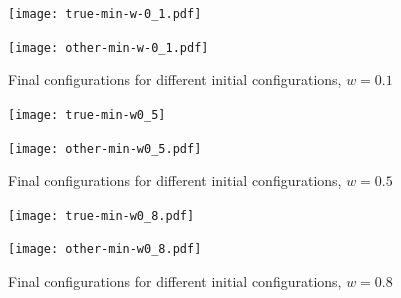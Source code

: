 \documentclass[12pt,oneside,final]{thesis}\usepackage[]{graphicx}\usepackage[]{color}
\begin{document}
\begin{figure}
\begin{minipage}[b]{0.46\linewidth}
\centering
\texttt{[image: true-min-w-0\_1.pdf]}

\label{fig:Finalconfig-MultMin-w-0_1_a}
\end{minipage}
\hspace{0.5cm}
\begin{minipage}[b]{0.46\linewidth}
\centering
\texttt{[image: other-min-w-0\_1.pdf]}

\label{fig:Finalconfig-MultMin-w-0_1_b}
\end{minipage}

\caption{Final configurations for different initial configurations, $w=0.1$ }
\label{fig:Finalconfig-MultMin-w-0_1}


\end{figure}




\begin{figure}
\begin{minipage}[b]{0.46\linewidth}
\centering
\texttt{[image: true-min-w0\_5]}

\label{fig:Finalconfig-MultMin-w-0_5_a}

\end{minipage}
\hspace{0.5cm}
\begin{minipage}[b]{0.46\linewidth}
\centering
\texttt{[image: other-min-w0\_5.pdf]}

\label{fig:Finalconfig-MultMin-w-0_5_b}

\end{minipage}

\caption{Final configurations for different initial configurations, $w=0.5$ }
\label{fig:Finalconfig-MultMin-w-0_5}

\end{figure}

\begin{figure}
\begin{minipage}[b]{0.46\linewidth}
\centering
\texttt{[image: true-min-w0\_8.pdf]}
\label{fig:Finalconfig-MultMin-w-0_8_a}


\end{minipage}
\hspace{0.5cm}
\begin{minipage}[b]{0.46\linewidth}
\centering
\texttt{[image: other-min-w0\_8.pdf]}
\label{fig:Finalconfig-MultMin-w-0_8_b}


\end{minipage}

\caption{Final configurations for different initial configurations, $w=0.8$ }
\label{fig:Finalconfig-MultMin-w-0_8}

\end{figure}
\end{document}
